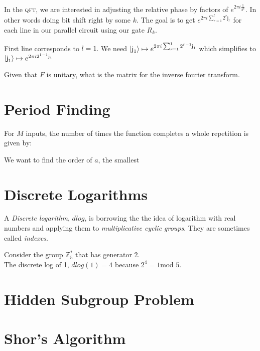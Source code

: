 In the \textsc{qft}, we are interested in adjusting the relative phase by factors of 
$e^{2\pi i \frac{1}{2^k}}$. In other words doing bit shift right by some $k$. 
The goal is to get  $e^{2\pi i \sum^{l}_{r=1} 2^{r} \textsf{j}_r }$ for each line in our 
parallel circuit using our gate $R_k$.

First line corresponds to $l = 1$. We need $\left|\textsf{j}_1\right\rangle \mapsto e^{2\pi i \sum^{1}_{r=1} 2^{r-1} \textsf{j}_1}$
which simplifies to $\left|\textsf{j}_1\right\rangle \mapsto e^{2\pi i 2^{1-1} \textsf{j}_1}$

\begin{example}
Given that $F$ is unitary, what is the matrix for the inverse fourier transform.
\end{example}







\section{Period Finding}


For $M$ inputs, the number of times the function completes a whole repetition is given by:



We want to find the order of $a$, the smallest 






\section{Discrete Logarithms}



A \textit{Discrete logarithm}, $dlog$, is borrowing the the idea of logarithm with real numbers 
and applying them to \textit{multiplicative cyclic groups}. 
They are sometimes called \textit{indexes}.

\begin{example}
Consider the group $\mathbb{Z}^{*}_{5}$ that has generator 2. \\ 
The discrete log of 1, $dlog(1) = 4$ because $2^4 = 1 \text{mod } 5$.
\end{example}

\frmrule

\section{Hidden Subgroup Problem}










\section{Shor's Algorithm}